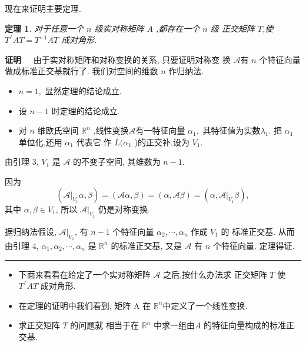 \documentclass[13pt]{beamer}
\newtheorem{thm}{定理}
\def\qed{\nopagebreak\hfill{\rule{4pt}{7pt}}\medbreak}
\def\pf{{\bf 证明~~ }}
\def\Rn{\mathbb{R}^n}
\def\A{\mathscr{A}}
\def\a{\alpha}
\def\b{\beta}
\begin{document}
\begin{frame}
现在来证明主要定理.
\begin{thm}
对于任意一个 $n$ 级实对称矩阵 $A$ ,都存在一个 $n$ 级 正交矩阵 $T$,使$T^{\, \prime}AT = T ^{-1} {A T}$ 成对角形. 
\end{thm}
\pf 
由于实对称矩阵和对称变换的关系, 只要证明对称变 换 $\A$有 $n$ 个特征向量做成标准正交基就行了. 我们对空间的维数 $n$ 作归纳法.
\begin{itemize}
\item $n=1,$ 显然定理的结论成立. 
\item 设 $n-1$ 时定理的结论成立.
\item 对 $n$ 维欧氏空间 $\Rn$ ,线性变换$\A$有一特征向量 ${\alpha}_{1},$ 其特征值为实数$\lambda_{1} .$  把 ${\alpha}_{1}$ 单位化,还用 ${\alpha}_{1}$
代表它.作 $L ( {\a}_{1}$ )的正交补,设为 $V_{1}.$ 
\end{itemize}

\end{frame}


\begin{frame}
由\alert{引理 3}, $V_{1}$ 是 $\mathscr{A}$ 的不变子空间, 其维数为 $n-1$.

因为$$(\A|_{V_{1}} {\a}, {\beta})=(\A {\a}, {\beta})=({\alpha}, \A {\beta})=({\alpha}, \A|_{V_{1}} {\beta}),$$ 其中 $\a, \b \in V_1$, 所以 $\A|_{V_{1}}$ 仍是对称变换.

据归纳法假设, $\A|_{V_{1}}$, 有 $n-1$ 个特征向量 ${\alpha}_{2}, \cdots, {\alpha}_{n}$ 作成 $V_{1}$ 的
标准正交基.
从而由\alert{引理 4}, ${\alpha}_{1}, {\alpha}_{2}, \cdots, {\alpha}_{n}$ 是 $\mathbb{R}^{n}$ 的标准正交基, 又是 $\mathscr{A}$ 有
$n$ 个特征向量. 定理得证. 
\qed
\begin{itemize}
\item  下面来看看在给定了一个实对称矩阵 $\A$ 之后,按什么办法求 正交矩阵 $T$ 使$T^{\, \prime}AT$ 成对角形. 
\item  在定理的证明中我们看到, 矩阵 A 在 $\Rn$中定义了一个线性变换.
\item  求正交矩阵 $T$ 的问题就 相当于在 $\Rn$ 中求一组由$A$ 的\alert{特征向量}构成的标准正交基.
\end{itemize}
\end{frame}
\end{document}
